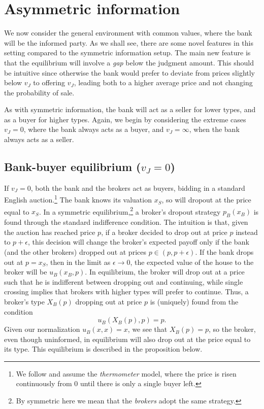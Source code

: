 \documentclass[11pt,twopage]{article}
\begin{document}
 
\section{Asymmetric information}
\label{sec:asymmetric-information}

We now consider the general environment with common values, where the
bank will be the informed party. As we shall see, there are some novel
features in this setting compared to the symmetric information
setup. The main new feature is that the equilibrium will involve a
\emph{gap} below the judgment amount. This should be intuitive since
otherwise the bank would prefer to deviate from prices slightly below
$v_J$ to offering $v_J$, leading both to a higher average price and
not changing the probability of sale.

As with symmetric information, the bank will act as a seller for lower
types, and as a buyer for higher types. Again, we begin by considering
the extreme cases $v_J = 0$, where the bank always acts as a buyer,
and $v_J = \infty$, when the bank always acts as a seller.

\subsection{Bank-buyer equilibrium ($v_J = 0$)}
\label{sec:vj0}

If $v_J=0$, both the bank and the brokers act as buyers, bidding in a
standard English auction.\footnote{We follow \cite{milgrom1982theory}
  and assume the \emph{thermometer} model, where the price is risen
  continuously from $0$ until there is only a single buyer left.} The
bank knows its valuation $x_S$, so will dropout at the price equal to
$x_S$. In a symmetric equilibrium,\footnote{By symmetric here we mean
  that the \emph{brokers} adopt the same strategy.} a broker's dropout
strategy $p_B(x_B)$ is found through the standard indifference
condition. The intuition is that, given the auction has reached price
$p$, if a broker decided to drop out at price $p$ instead to
$p+\epsilon$, this decision will change the broker's expected payoff
only if the bank (and the other brokers) dropped out at prices $p \in
(p,p+\epsilon)$. If the bank drops out at $p = x_S$, then in the limit
as $\epsilon \to 0$, the expected value of the house to the broker
will be $u_B(x_B, p)$. In equilibrium, the broker will drop out at a
price such that he is indifferent between dropping out and continuing,
while single crossing implies that brokers with higher types will
prefer to continue. Thus, a broker's type $X_B(p)$ dropping out at
price $p$ is (uniquely) found from the condition \[ u_B(X_B(p),p) =
p.\] Given our normalization $u_B(x,x) = x$, we see that $X_B(p) = p$,
so the broker, even though uninformed, in equilibrium will also drop
out at the price equal to its type. This equilibrium is described in
the proposition below.
\end{document}
